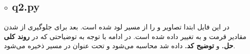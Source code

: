 \documentclass[a4paper,12pt]{article}
\begin{document}
\subsection*{$\circ$ q2.py}
در این فایل ابتدا تصاویر 
و 
را از مسیر
لود شده است. بعد برای جلوگیری از 
شدن مقادیر قرمت 
و 
به 
تغییر داده شده است. در ادامه با توجه به توضیاحتی که در 
\textbf{روند کلی حل.}
و
\textbf{توضیح کد.}
داده شد 
محاسبه می‌شود و تحت عنوان 
در مسیر
ذخیره می‌شود.
\end{document}
